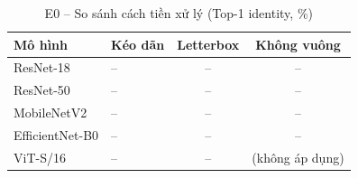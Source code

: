 \begin{table}[t]
\centering
\small
\caption{E0 – So sánh cách tiền xử lý (Top-1 identity, \%)}
\begin{tabular}{llcc}
\toprule
Mô hình & Kéo dãn & Letterbox & Không vuông \\
\midrule
ResNet-18 & – & – & – \\
ResNet-50 & – & – & – \\
MobileNetV2 & – & – & – \\
EfficientNet-B0 & – & – & – \\
ViT-S/16 & – & – & (không áp dụng) \\
\bottomrule
\end{tabular}
\end{table}
